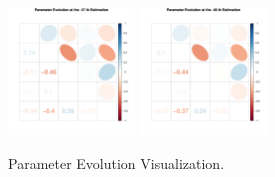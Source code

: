 \begin{figure}[h]
\includegraphics[width=0.3\textwidth,height=0.2\textheight]{Chapters/05MCMCOU/plots/paraEvolution/corMatrix47.pdf}
\includegraphics[width=0.3\textwidth,height=0.2\textheight]{Chapters/05MCMCOU/plots/paraEvolution/corMatrix48.pdf}
\caption{Parameter Evolution Visualization. }
\end{figure}
